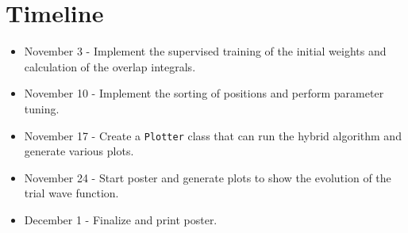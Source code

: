 \documentclass[prb,aps,twocolumn,showpacs,10pt]{revtex4-1}
\begin{document}
\section{Timeline}
\begin{itemize}
\item November 3 - Implement the supervised training of the initial weights and calculation of the overlap integrals. 
\item November 10 - Implement the sorting of positions and perform parameter tuning.
\item November 17 - Create a \texttt{Plotter} class that can run the hybrid algorithm and generate various plots. 
\item November 24 - Start poster and generate plots to show the evolution of the trial wave function. 
\item December 1 - Finalize and print poster.
\end{itemize}
\end{document}
